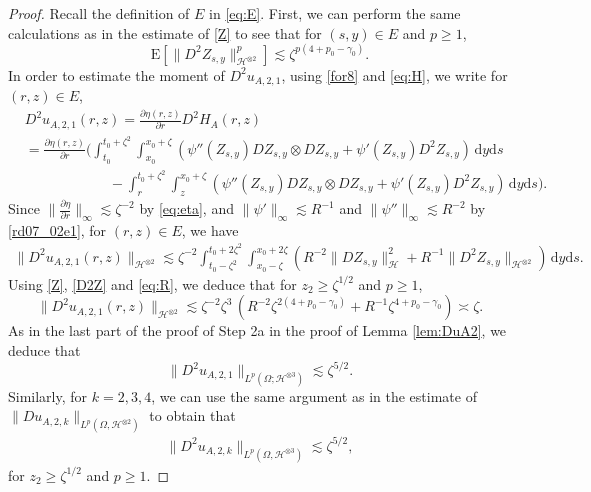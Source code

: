 \documentclass[12pt,a4paper]{article}
\newcommand{\E}{\mathrm{E}}
\newcommand{\HH}{\mathcal{H}}
\renewcommand{\d}{\mathrm{d}}
\newcommand {\deltah}{{\zeta}}
\newcommand{\<}{\langle}
\renewcommand{\>}{\rangle}
\begin{document}
 \begin{proof}
           Recall the definition of $E$ in \eqref{eq:E}.
           First, we can perform the same calculations  as in the estimate of  \eqref{Z} to see that 
                       for $(s,y)\in E$ and $p\geq1$,
           \begin{equation} \label{D2Z}
             \E\left[\|D^2Z_{s,y}\|_{\mathcal{H}^{\otimes 2}}^p \right] \lesssim \deltah^{p(4+p_0-\gamma_0)}.
           \end{equation}
           In order to estimate the moment of $D^2u_{A,2,1}$, using \eqref{for8} and \eqref{eq:H}, 
           we write for $(r,z)\in E$,
           \begin{align*}
           &D^2u_{A,2,1}(r,z) = \frac{\partial \eta(r,z)}{\partial r}D^2H_A(r,z)\\
           &=\frac{\partial \eta(r,z)}{\partial r} \bigg(\int_{t_0}^{t_0+\deltah^2}\int_{x_0}^{x_0+\deltah}(\psi''(Z_{s,y}) DZ_{s,y}\otimes
           DZ_{s,y}
           + \psi'(Z_{s,y})D^2Z_{s,y}) \, 
           \d y\d s\\
           &\qquad\qquad\quad\quad
           - \int_{r}^{t_0+\deltah^2}\int_{z}^{x_0+\deltah}(\psi''(Z_{s,y})DZ_{s,y}\otimes
           DZ_{s,y}
           + \psi'(Z_{s,y})D^2Z_{s,y}) \, \d y\d s\bigg).
           \end{align*}
          Since $\|\frac{\partial \eta}{\partial r}\|_{\infty} \lesssim \deltah^{-2}$ by \eqref{eq:eta}, and
          $\|\psi'\|_{\infty} \lesssim R^{-1}$ and $\|\psi''\|_{\infty} \lesssim R^{-2}$ by \eqref{rd07_02e1}, 
          for $(r,z)\in E$, we have 
          \begin{align*}
          \|D^2u_{A,2,1}(r,z)\|_{\HH^{\otimes 2}} \lesssim \deltah^{-2} \int_{t_0-\deltah^2}^{t_0+2\deltah^2}\int_{x_0-\deltah}^{x_0+2\deltah}
          (R^{-2}\|DZ_{s,y}\|_{\HH}^2 + R^{-1}\|D^2Z_{s,y}\|_{\HH^{\otimes2}})\, \d y\d s.
          \end{align*}
          Using \eqref{Z}, \eqref{D2Z} and \eqref{eq:R},  %
          we deduce that for $z_2\geq \deltah^{1/2}$ and $p\geq1$, 
\begin{equation*} 
    \|D^2u_{A,2,1}(r,z)\|_{\HH^{\otimes 2}} \lesssim \deltah^{-2} \deltah^3 \, (R^{-2} \deltah^{2(4 + p_0 - \gamma_0)} + R^{-1} \deltah^{4 + p_0 - \gamma_0}) \asymp \zeta .
\end{equation*}
As in the last part of the proof of Step 2a in the proof of Lemma \ref{lem:DuA2}, we deduce that
\begin{equation*} 
              \|D^2u_{A,2,1}\|_{L^p(\Omega;\mathcal{H}^{\otimes3})} \lesssim \deltah^{5/2}.
 \end{equation*}
          Similarly, for $k=2,3,4$, we can use the same argument as in the estimate of $\|Du_{A,2,k}\|_{L^p(\Omega, \HH^{\otimes2})}$
          to obtain that
          \begin{align*}
          \|D^2u_{A,2,k}\|_{L^p(\Omega, \HH^{\otimes3})} \lesssim \deltah^{5/2},
          \end{align*}
          for $z_2\geq \deltah^{1/2}$ and $p\geq1$.
          

\end{proof}
\end{document}
